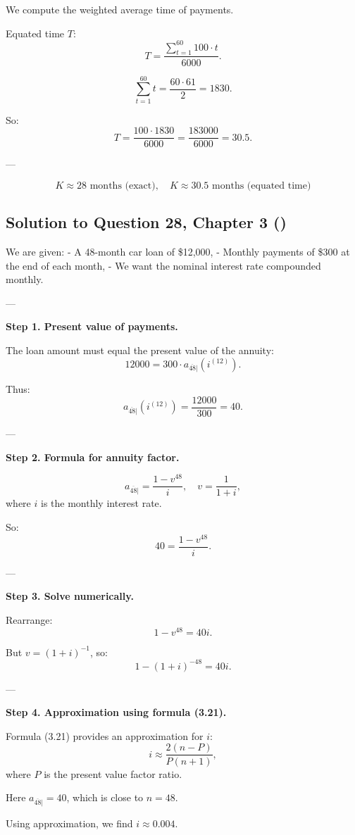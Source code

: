 \documentclass[12pt, a4paper]{article}
\begin{document}
{We compute the weighted average time of payments.  

Equated time $T$:
\[
T = \frac{\sum_{t=1}^{60} 100 \cdot t}{6000}.
\]

\[
\sum_{t=1}^{60} t = \frac{60 \cdot 61}{2} = 1830.
\]

So:
\[
T = \frac{100 \cdot 1830}{6000} = \frac{183000}{6000} = 30.5.
\]

---

\[
\boxed{K \approx 28 \text{ months (exact)}, \quad K \approx 30.5 \text{ months (equated time)}}
\]

\subsection*{Solution to Question 28, Chapter 3 (\cite{toi3rd})}

We are given:  
- A 48-month car loan of \$12{,}000,  
- Monthly payments of \$300 at the end of each month,  
- We want the nominal interest rate compounded monthly.

---

\textbf{Step 1. Present value of payments.}

The loan amount must equal the present value of the annuity:
\[
12000 = 300 \cdot a_{\overline{48}|}(i^{(12)}).
\]

Thus:
\[
a_{\overline{48}|}(i^{(12)}) = \frac{12000}{300} = 40.
\]

---

\textbf{Step 2. Formula for annuity factor.}

\[
a_{\overline{48}|} = \frac{1-v^{48}}{i}, 
\quad v=\frac{1}{1+i},
\]
where $i$ is the monthly interest rate.

So:
\[
40 = \frac{1-v^{48}}{i}.
\]

---

\textbf{Step 3. Solve numerically.}

Rearrange:
\[
1-v^{48} = 40i.
\]

But $v=(1+i)^{-1}$, so:
\[
1-(1+i)^{-48} = 40i.
\]

---

\textbf{Step 4. Approximation using formula (3.21).}

Formula (3.21) provides an approximation for $i$:
\[
i \approx \frac{2(n-P)}{P(n+1)},
\]
where $P$ is the present value factor ratio.

Here $a_{\overline{48}|} = 40$, which is close to $n=48$.

Using approximation, we find $i \approx 0.004$.  

}
\end{document}
